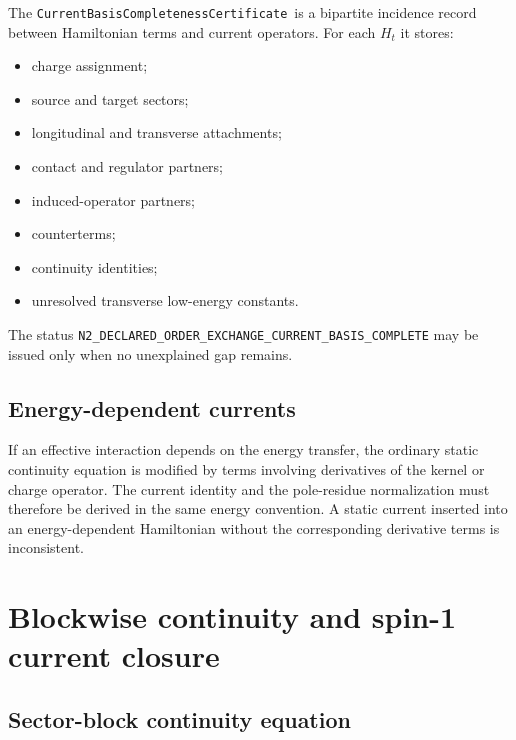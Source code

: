 \documentclass[11pt]{article}
\newcommand{\CurrentCertificate}{\texttt{CurrentBasis\allowbreak Completeness\allowbreak Certificate}}
\begin{document}
The \CurrentCertificate\ is a bipartite incidence record between Hamiltonian
terms and current operators.  For each \(H_t\) it stores:
\begin{itemize}
\item charge assignment;
\item source and target sectors;
\item longitudinal and transverse attachments;
\item contact and regulator partners;
\item induced-operator partners;
\item counterterms;
\item continuity identities;
\item unresolved transverse low-energy constants.
\end{itemize}
The status
\texttt{N2\_DECLARED\_ORDER\_EXCHANGE\_CURRENT\_BASIS\_COMPLETE}
may be issued only when no unexplained gap remains.

\subsection{Energy-dependent currents}

If an effective interaction depends on the energy transfer, the ordinary
static continuity equation is modified by terms involving derivatives of the
kernel or charge operator.  The current identity and the pole-residue
normalization must therefore be derived in the same energy convention.  A
static current inserted into an energy-dependent Hamiltonian without the
corresponding derivative terms is inconsistent.

\section{Blockwise continuity and spin-1 current closure}
\label{sec:continuity}

\subsection{Sector-block continuity equation}
\end{document}
